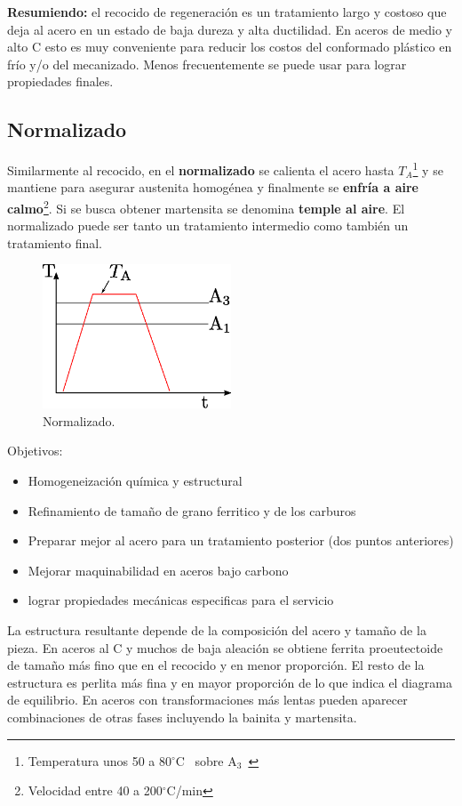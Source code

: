 \documentclass{article}
\newcommand{\Athree}{A\ensuremath{_{3}}}
\newcommand{\grad}{\ensuremath{^\circ \mathrm{C}}}
\begin{document}
\textbf{Resumiendo:} el recocido de regeneración es un tratamiento largo y costoso que deja al acero en un estado de baja dureza y alta ductilidad. En aceros de medio y alto C esto es muy conveniente para reducir los costos del conformado plástico en frío y/o del mecanizado. Menos frecuentemente se puede usar para lograr propiedades finales.

\subsection{Normalizado}
Similarmente al recocido, en el \textbf{normalizado} se calienta el acero hasta $T_A$\footnote{Temperatura unos 50 a 80\grad~ sobre \Athree~} y se mantiene para asegurar austenita homogénea y finalmente se \textbf{enfría a aire calmo}\footnote{Velocidad entre 40 a 200\grad{}/min}. Si se busca obtener martensita se denomina \textbf{temple al aire}. El normalizado puede ser tanto un tratamiento intermedio como también un tratamiento final.

\begin{figure}[htb!]
    \centering
    \includegraphics[width=0.5\textwidth]{fig/TTnorm.eps}
    \caption{Normalizado.}
    \label{fig:TTnorm}
\end{figure}

Objetivos:
\begin{itemize}
    \item Homogeneización química y estructural
    \item Refinamiento de tamaño de grano ferritico y de los carburos
    \item Preparar mejor al acero para un tratamiento posterior (dos puntos anteriores)
    \item Mejorar maquinabilidad en aceros bajo carbono
    \item lograr propiedades mecánicas especificas para el servicio
\end{itemize}

La estructura resultante depende de la composición del acero y tamaño de la pieza. En aceros al C y muchos de baja aleación se obtiene ferrita proeutectoide de tamaño más fino que en el recocido y en menor proporción. El resto de la estructura es perlita más fina y en mayor proporción de lo que indica el diagrama de equilibrio. En aceros con transformaciones más lentas pueden aparecer combinaciones de otras fases incluyendo la bainita y martensita.
\end{document}
